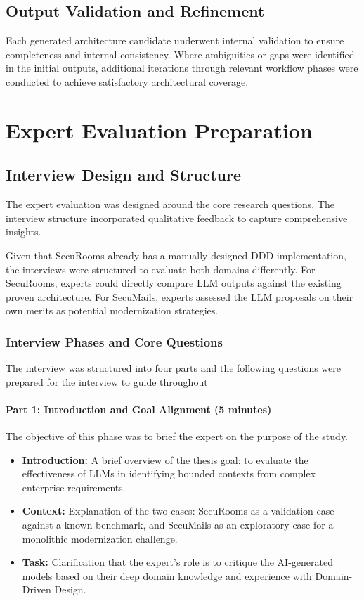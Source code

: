 \subsection{Output Validation and Refinement}
Each generated architecture candidate underwent internal validation to ensure completeness and internal consistency. Where ambiguities or gaps were identified in the initial outputs, additional iterations through relevant workflow phases were conducted to achieve satisfactory architectural coverage.

\section{Expert Evaluation Preparation}

\subsection{Interview Design and Structure}
The expert evaluation was designed around the core research questions. The interview structure incorporated qualitative feedback to capture comprehensive insights.

Given that SecuRooms already has a manually-designed DDD implementation, the interviews were structured to evaluate both domains differently. For SecuRooms, experts could directly compare LLM outputs against the existing proven architecture. For SecuMails, experts assessed the LLM proposals on their own merits as potential modernization strategies.

\subsubsection{Interview Phases and Core Questions}
\label{sec:interview_phases}

The interview was structured into four parts and the following questions were prepared for the interview to guide throughout

\paragraph{Part 1: Introduction and Goal Alignment (5 minutes)}
The objective of this phase was to brief the expert on the purpose of the study.
\begin{itemize}
    \item \textbf{Introduction:} A brief overview of the thesis goal: to evaluate the effectiveness of LLMs in identifying bounded contexts from complex enterprise requirements.
    \item \textbf{Context:} Explanation of the two cases: SecuRooms as a validation case against a known benchmark, and SecuMails as an exploratory case for a monolithic modernization challenge.
    \item \textbf{Task:} Clarification that the expert's role is to critique the AI-generated models based on their deep domain knowledge and experience with Domain-Driven Design.
\end{itemize}

